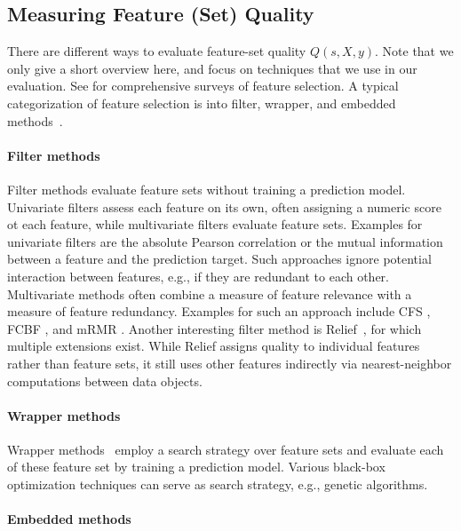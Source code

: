 \documentclass{article}
\theoremstyle{definition}
\begin{document}
\subsection{Measuring Feature (Set) Quality}

There are different ways to evaluate feature-set quality $Q(s,X,y)$.
Note that we only give a short overview here, and focus on techniques that we use in our evaluation.
See \cite{chandrashekar2014survey,li2017feature} for comprehensive surveys of feature selection.
A typical categorization of feature selection is into filter, wrapper, and embedded methods~\cite{guyon2003introduction}.

\paragraph{Filter methods}

Filter methods evaluate feature sets without training a prediction model.
Univariate filters assess each feature on its own, often assigning a numeric score ot each feature, while multivariate filters evaluate feature sets.
Examples for univariate filters are the absolute Pearson correlation or the mutual information between a feature and the prediction target.
Such approaches ignore potential interaction between features, e.g., if they are redundant to each other.
Multivariate methods often combine a measure of feature relevance with a measure of feature redundancy.
Examples for such an approach include CFS \cite{hall1999correlation}, FCBF \cite{yu2003feature}, and mRMR \cite{peng2005feature}.
Another interesting filter method is Relief~\cite{kira1992feature}, for which multiple extensions exist.
While Relief assigns quality to individual features rather than feature sets, it still uses other features indirectly via nearest-neighbor computations between data objects.

\paragraph{Wrapper methods}

Wrapper methods~\cite{kohavi1997wrappers} employ a search strategy over feature sets and evaluate each of these feature set by training a prediction model.
Various black-box optimization techniques can serve as search strategy, e.g., genetic algorithms.

\paragraph{Embedded methods}
\end{document}
